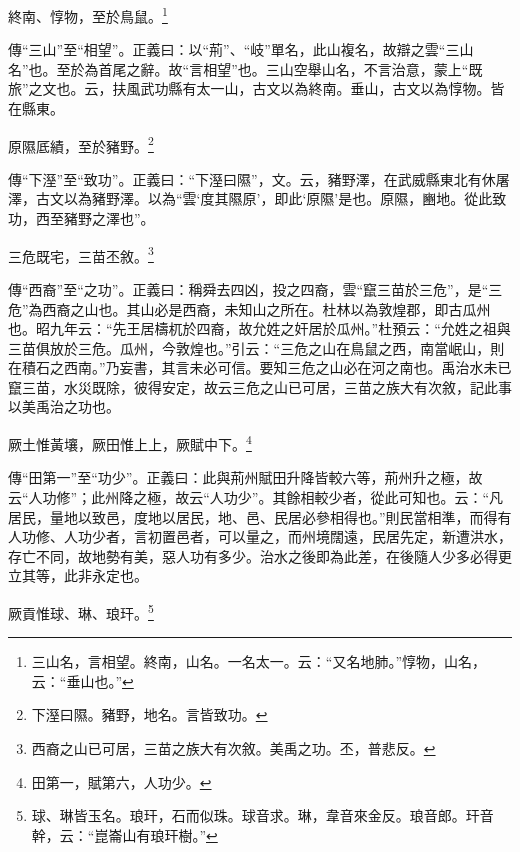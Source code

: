 終南、惇物，至於鳥鼠。\footnote{三山名，言相望。終南，山名。一名太一。云：“又名地肺。”惇物，山名，云：“垂山也。”}

{\noindent\zhuan{}\fzbyks 傳“三山”至“相望”。正義曰：以“荊”、“岐”單名，此山複名，故辯之雲“三山名”也。至於為首尾之辭。故“言相望”也。三山空舉山名，不言治意，蒙上“既旅”之文也。云，扶風武功縣有太一山，古文以為終南。垂山，古文以為惇物。皆在縣東。 \par}

原隰厎績，至於豬野。\footnote{下溼曰隰。豬野，地名。言皆致功。}

{\noindent\zhuan{}\fzbyks 傳“下溼”至“致功”。正義曰：“下溼曰隰”，文。云，豬野澤，在武威縣東北有休屠澤，古文以為豬野澤。以為“雲‘度其隰原’，即此‘原隰’是也。原隰，豳地。從此致功，西至豬野之澤也”。 \par}

三危既宅，三苗丕敘。\footnote{西裔之山已可居，三苗之族大有次敘。美禹之功。丕，普悲反。}

{\noindent\zhuan{}\fzbyks 傳“西裔”至“之功”。正義曰：稱舜去四凶，投之四裔，雲“竄三苗於三危”，是“三危”為西裔之山也。其山必是西裔，未知山之所在。杜林以為敦煌郡，即古瓜州也。昭九年云：“先王居檮杌於四裔，故允姓之奸居於瓜州。”杜預云：“允姓之祖與三苗俱放於三危。瓜州，今敦煌也。”引云：“三危之山在鳥鼠之西，南當岷山，則在積石之西南。”乃妄書，其言未必可信。要知三危之山必在河之南也。禹治水未已竄三苗，水災既除，彼得安定，故云三危之山已可居，三苗之族大有次敘，記此事以美禹治之功也。 \par}

厥土惟黃壤，厥田惟上上，厥賦中下。\footnote{田第一，賦第六，人功少。}

{\noindent\zhuan{}\fzbyks 傳“田第一”至“功少”。正義曰：此與荊州賦田升降皆較六等，荊州升之極，故云“人功修”；此州降之極，故云“人功少”。其餘相較少者，從此可知也。云：“凡居民，量地以致邑，度地以居民，地、邑、民居必參相得也。”則民當相準，而得有人功修、人功少者，言初置邑者，可以量之，而州境闊遠，民居先定，新遭洪水，存亡不同，故地勢有美，惡人功有多少。治水之後即為此差，在後隨人少多必得更立其等，此非永定也。 \par}

厥貢惟球、琳、琅玕。\footnote{球、琳皆玉名。琅玕，石而似珠。球音求。琳，韋音來金反。琅音郎。玕音幹，云：“崑崙山有琅玕樹。”}

